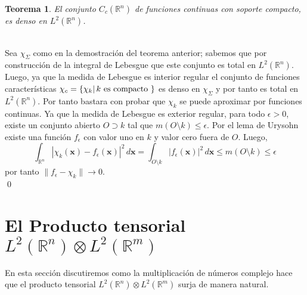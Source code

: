 \documentclass[12pt]{book}
\numberwithin{equation}{chapter}
\newtheorem{theorem}{Teorema}[chapter]
\def\n{\noindent}
\def\R{\mathbb{R}}
\def\rar{\rightarrow}
\def\x{\mathbf{x}}
\def\X{\chi}
\begin{document}
\vspace{5 mm}

\begin{theorem}
El conjunto $C_{c}(\R^{n})$ de funciones continuas con soporte compacto, es denso en $L^{2}(\R^{n})$. 
\end{theorem}
\n {\bf Demostraci\'on}\\
Sea $\X_{\Sigma}$ como en la demostraci\'on del teorema anterior; sabemos que por construcci\'on de la integral de Lebesgue que este conjunto es total en $L^{2}(\R^{n})$. Luego, ya que la medida de Lebesgue es interior regular el conjunto de funciones caracter\'isticas $\X_{c}= \{ \X_{k} |\, k \hbox{ es compacto } \}$ es denso en $\X_{\Sigma}$ y por tanto es total en $L^{2}(\R^{n})$. Por tanto bastara con probar que $\X_{k}$ se puede aproximar por funciones continuas. Ya que la medida de Lebesgue es exterior regular, para todo $\epsilon >0$, existe un conjunto abierto $O \supset k$ tal que $ m(O \setminus k) \leq \epsilon $. Por el lema de Urysohn existe una funci\'on $f_{\epsilon}$ con valor uno en $k$ y valor cero fuera de $O$. Luego,
$$ \int_{\R^{n}}  |\X_{k}(\x) - f_{\epsilon}(\x)|^{2} \, d\x  = \int_{O\setminus k} |f_{\epsilon}(\x)|^{2}\, d\x \leq m(O \setminus k) \leq \epsilon $$
por tanto $\| f_{\epsilon} - \X_{k} \| \rar 0$. \\ \qed 

\newpage

\section{El Producto tensorial $L^{2}(\R^{n}) \otimes L^{2}(\R^{m}) $}

En esta secci\'on discutiremos como la multiplicaci\'on de n\'umeros complejo hace que el producto tensorial $ L^{2}(\R^{n}) \otimes L^{2}(\R^{m}) $ surja de manera natural. \\
\end{document}
